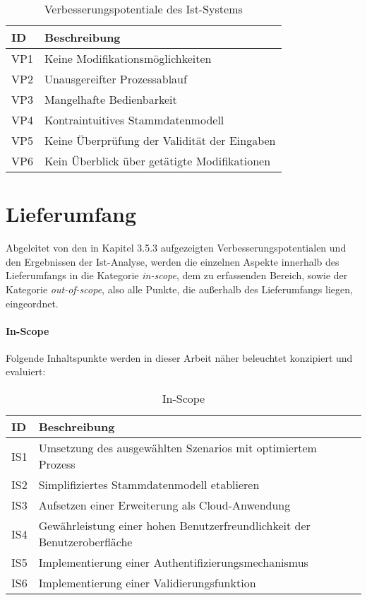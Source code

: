 \begin{table}[H]
	\centering
	\begin{tabularx}{\textwidth}{|l|X|} 
		\hline
		ID  &   
		Beschreibung  \\ 
		\hline\hline
		VP1 &   
		Keine Modifikationsmöglichkeiten  \\ 
		VP2 &   
		Unausgereifter Prozessablauf \\ 
		VP3 &   
		Mangelhafte Bedienbarkeit  \\ 
		VP4 &   
		Kontraintuitives Stammdatenmodell  \\ 
		VP5 &   
		Keine Überprüfung der Validität der Eingaben  \\ 
		VP6 &   
		Kein Überblick über getätigte Modifikationen  \\ 
		\hline
	\end{tabularx}
	\caption{\label{tab:potentiale}Verbesserungspotentiale des Ist-Systems}
\end{table}

% 
% 
% 
% 
% 
% 
\newpage
\section{Lieferumfang}
Abgeleitet von den in Kapitel 3.5.3 aufgezeigten Verbesserungspotentialen und den Ergebnissen der Ist-Analyse, werden die einzelnen Aspekte innerhalb des Lieferumfangs in die Kategorie \textit{in-scope}, dem zu erfassenden Bereich, sowie der Kategorie \textit{out-of-scope}, also alle Punkte, die außerhalb des Lieferumfangs liegen, eingeordnet.

\paragraph{In-Scope}
Folgende Inhaltspunkte werden in dieser Arbeit näher beleuchtet konzipiert und evaluiert:
\begin{table}[H]
	\centering
	\begin{tabularx}{\textwidth}{|l|X|} 
		\hline
		ID  &   
		Beschreibung  \\ 
		\hline\hline
		IS1 &   
		Umsetzung des ausgewählten Szenarios mit optimiertem Prozess  \\ 
		IS2 &   
		Simplifiziertes Stammdatenmodell etablieren  \\ 
		IS3 &   
		Aufsetzen einer Erweiterung als Cloud-Anwendung   \\ 
		IS4 &   
		Gewährleistung einer hohen Benutzerfreundlichkeit der Benutzeroberfläche  \\ 
		IS5 &   
		Implementierung einer Authentifizierungsmechanismus \\ 
		IS6 &   
		Implementierung einer Validierungsfunktion \\ 
		\hline
	\end{tabularx}
	\caption{\label{tab:scope}In-Scope}
\end{table}

